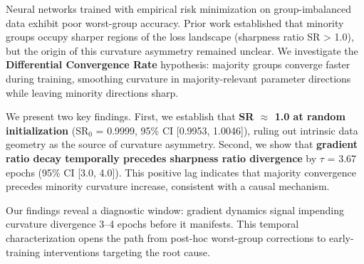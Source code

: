 Neural networks trained with empirical risk minimization on group-imbalanced data exhibit poor worst-group accuracy. Prior work established that minority groups occupy sharper regions of the loss landscape (sharpness ratio SR > 1.0), but the origin of this curvature asymmetry remained unclear. We investigate the \textbf{Differential Convergence Rate} hypothesis: majority groups converge faster during training, smoothing curvature in majority-relevant parameter directions while leaving minority directions sharp.

We present two key findings. First, we establish that \textbf{SR $\approx$ 1.0 at random initialization} (SR$_0$ = 0.9999, 95\% CI [0.9953, 1.0046]), ruling out intrinsic data geometry as the source of curvature asymmetry. Second, we show that \textbf{gradient ratio decay temporally precedes sharpness ratio divergence} by $\tau$ = 3.67 epochs (95\% CI [3.0, 4.0]). This positive lag indicates that majority convergence precedes minority curvature increase, consistent with a causal mechanism.

Our findings reveal a diagnostic window: gradient dynamics signal impending curvature divergence 3--4 epochs before it manifests. This temporal characterization opens the path from post-hoc worst-group corrections to early-training interventions targeting the root cause.
